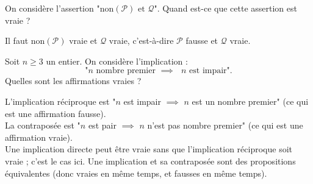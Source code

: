 \begin{question}
On considère l'assertion "$\text{non}(\mathcal{P}) \text{ et } \mathcal{Q}$".
Quand est-ce que cette assertion est vraie ?
\begin{answers} 
\end{answers}
\begin{explanations}
Il faut  $\text{non}(\mathcal{P})$ vraie et $\mathcal{Q}$ vraie, c'est-à-dire
$\mathcal{P}$ fausse et $\mathcal{Q}$ vraie.
\end{explanations}
\end{question}


\begin{question}
Soit $n \ge 3$ un entier.
On considère l'implication :
$$\text{"$n$ nombre premier $\implies$ $n$ est impair".}$$
Quelles sont les affirmations vraies ?
\begin{answers}
\end{answers}
\begin{explanations}
L'implication réciproque est "$n$ est impair $\implies$ $n$ est un nombre premier" (ce qui est une affirmation fausse). \\
La contraposée est "$n$ est pair $\implies$  $n$ n'est pas nombre premier" (ce qui est une affirmation vraie). \\
Une implication directe peut être vraie sans que l'implication réciproque soit vraie ; c'est le cas ici.
Une implication et sa contraposée sont des propositions équivalentes (donc vraies en même temps, et fausses en même temps). \\
\end{explanations}
\end{question}


